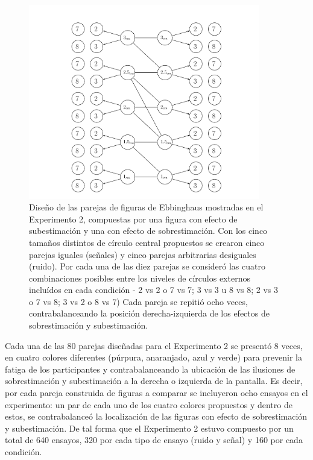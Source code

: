 \begin{itemize}
\begin{figure}[th]
\centering
\includegraphics[width=0.9\textwidth]{Figures/Estimulos_Experimento2} 
\decoRule
\caption[Diseño de Estimulos en el Experimento 2]{Diseño de las parejas de figuras de Ebbinghaus mostradas en el Experimento 2, compuestas por una figura con efecto de subestimación y una con efecto de sobrestimación. Con los cinco tamaños distintos de círculo central propuestos se crearon cinco parejas iguales (señales) y cinco parejas arbitrarias desiguales (ruido). Por cada una de las diez parejas se consideró las cuatro combinaciones posibles entre los niveles de círculos externos incluídos en cada condición - 2 vs 2 o 7 vs 7; 3 vs 3 u 8 vs 8; 2 vs 3 o 7 vs 8; 3 vs 2 o 8 vs 7) Cada pareja se repitió ocho veces, contrabalanceando la posición derecha-izquierda de los efectos de sobrestimación y subestimación.}
\label{fig:Exp_2}
\end{figure}
\end{itemize}

Cada una de las 80 parejas diseñadas para el Experimento 2 se presentó 8 veces, en cuatro colores diferentes (púrpura, anaranjado, azul y verde) para prevenir la fatiga de los participantes y contrabalanceando la ubicación de las ilusiones de sobrestimación y subestimación a la derecha o izquierda de la pantalla. Es decir, por cada pareja construida de figuras a comparar se incluyeron ocho ensayos en el experimento: un par de cada uno de los cuatro colores propuestos y dentro de estos, se contrabalanceó la localización de las figuras con efecto de sobrestimación y subestimación. De tal forma que el Experimento 2 estuvo compuesto por un total de 640 ensayos, 320 por cada tipo de ensayo (ruido y señal) y 160 por cada condición.\\ 

